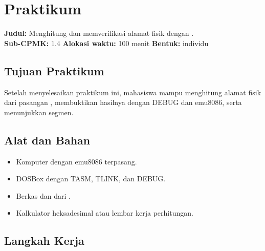 \section{Praktikum}
\label{sec:praktikum-bab6}

\begin{praktikumbox}
\vspace{1.1em}
\textbf{Judul:} Menghitung dan memverifikasi alamat fisik dengan
.\\[0.3em]
\textbf{Sub-CPMK:} 1.4 \quad\textbullet\quad
\textbf{Alokasi waktu:} 100 menit \quad\textbullet\quad
\textbf{Bentuk:} individu
\end{praktikumbox}

\subsection{Tujuan Praktikum}

Setelah menyelesaikan praktikum ini, mahasiswa mampu menghitung
alamat fisik dari pasangan , membuktikan hasilnya
dengan DEBUG dan emu8086, serta menunjukkan  segmen.

\subsection{Alat dan Bahan}

\begin{itemize}
    \item Komputer dengan emu8086 terpasang.
    \item DOSBox dengan TASM, TLINK, dan DEBUG.
    \item Berkas  dan 
          dari .
    \item Kalkulator heksadesimal atau lembar kerja perhitungan.
\end{itemize}

\subsection{Langkah Kerja}

